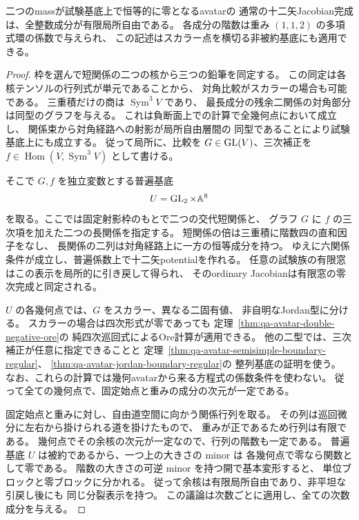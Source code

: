 \begin{theorem}[スカラー点を含む両mass零の全次数平坦性]
\label{thm:qa-avatar-zero-mass-flatness}
二つのmassが試験基底上で恒等的に零となるavatarの
通常の十二矢Jacobian完成は、全整数成分が有限局所自由である。
各成分の階数は重み $(1,1,2)$ の多項式環の係数で与えられ、
この記述はスカラー点を横切る非被約基底にも適用できる。
\end{theorem}
\begin{proof}
枠を選んで短関係の二つの核から三つの鉛筆を同定する。
この同定は各核テンソルの行列式が単元であることから、
対角比較がスカラーの場合も可能である。
三重積だけの商は $\operatorname{Sym}^3V$ であり、
最長成分の残余二関係の対角部分は同型のグラフを与える。
これは負断面上での計算で全幾何点において成立し、
関係束から対角経路への射影が局所自由層間の
同型であることにより試験基底上にも成立する。
従って局所に、比較を
$G\in\operatorname{GL}(V)$、三次補正を
$f\in\operatorname{Hom}(V,\operatorname{Sym}^3V)$ として書ける。

そこで $G,f$ を独立変数とする普遍基底
\[
 U=\operatorname{GL}_2\times\mathbb A^8
\]
を取る。ここでは固定射影枠のもとで二つの交代短関係と、
グラフ $G$ に $f$ の三次項を加えた二つの長関係を指定する。
短関係の倍は三重積に階数四の直和因子をなし、
長関係の二列は対角経路上に一方の恒等成分を持つ。
ゆえに六関係条件が成立し、普遍係数上で十二矢potentialを作れる。
任意の試験族の有限窓はこの表示を局所的に引き戻して得られ、
そのordinary Jacobianは有限窓の零次完成と同定される。

$U$ の各幾何点では、$G$ をスカラー、異なる二固有値、
非自明なJordan型に分ける。
スカラーの場合は四次形式が零であっても
定理~\ref{thm:qa-avatar-double-negative-ore}の
純四次巡回式によるOre計算が適用できる。
他の二型では、三次補正が任意に指定できることと
定理~\ref{thm:qa-avatar-semisimple-boundary-regular}、
\ref{thm:qa-avatar-jordan-boundary-regular}の
整列基底の証明を使う。
なお、これらの計算では幾何avatarから来る方程式の係数条件を使わない。
従って全ての幾何点で、固定始点と重みの成分の次元が一定である。

固定始点と重みに対し、自由道空間に向かう関係行列を取る。
その列は巡回微分に左右から掛けられる道を掛けたもので、
重みが正であるため行列は有限である。
幾何点でその余核の次元が一定なので、行列の階数も一定である。
普遍基底 $U$ は被約であるから、一つ上の大きさの minor は
各幾何点で零なら関数として零である。
階数の大きさの可逆 minor を持つ開で基本変形すると、
単位ブロックと零ブロックに分かれる。
従って余核は有限局所自由であり、非平坦な引戻し後にも
同じ分裂表示を持つ。
この議論は次数ごとに適用し、全ての次数成分を与える。
\end{proof}

